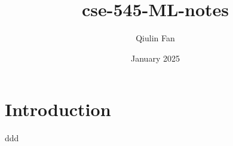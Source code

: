 \documentclass{article}
\title{cse-545-ML-notes}
\author{Qiulin Fan}
\date{January 2025}
\begin{document}
\maketitle

\section{Introduction}
ddd
\end{document}
